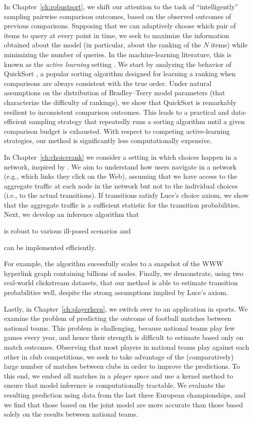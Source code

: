 In Chapter~\ref{ch:robustsort}, we shift our attention to the task of ``intelligently'' sampling pairwise comparison outcomes, based on the observed outcomes of previous comparisons.
Supposing that we can adaptively choose which pair of items to query at every point in time, we seek to maximize the information obtained about the model (in particular, about the ranking of the $N$ items) while minimizing the number of queries.
In the machine-learning literature, this is known as the \emph{active learning} setting \citep{settles2012active}.
We start by analyzing the behavior of QuickSort \citep{hoare1962quicksort}, a popular sorting algorithm designed for learning a ranking when comparisons are always consistent with the true order.
Under natural assumptions on the distribution of Bradley--Terry model parameters (that characterize the difficulty of rankings), we show that QuickSort is remarkably resilient to inconsistent comparison outcomes.
This leads to a practical and data-efficient sampling strategy that repeatedly runs a sorting algorithm until a given comparison budget is exhausted.
With respect to competing active-learning strategies, our method is significantly less computationally expensive.

In Chapter~\ref{ch:choicerank} we consider a setting in which choices happen in a network, inspired by \citet{kumar2015inverting}.
We aim to understand how users navigate in a network (e.g., which links they click on the Web), assuming that we have access to the aggregate traffic at each node in the network but not to the individual choices (i.e., to the actual transitions).
If transitions satisfy Luce's choice axiom, we show that the aggregate traffic is a sufficient statistic for the transition probabilities.
Next, we develop an inference algorithm that
\begin{enuminline}
\item is robust to various ill-posed scenarios and
\item can be implemented efficiently.
\end{enuminline}
For example, the algorithm sucessfully scales to a snapshot of the WWW hyperlink graph containing billions of nodes.
Finally, we demonstrate, using two real-world clickstream datasets, that our method is able to estimate transition probabilities well, despite the strong assumptions implied by Luce's axiom.

Lastly, in Chapter~\ref{ch:playerkern}, we switch over to an application in sports.
We examine the problem of predicting the outcome of football matches between national teams.
This problem is challenging, because national teams play few games every year, and hence their strength is difficult to estimate based only on match outcomes.
Observing that most players in national teams play against each other in club competitions, we seek to take advantage of the (comparatively) large number of matches between clubs in order to improve the predictions.
To this end, we embed all matches in a \emph{player space} and use a kernel method to ensure that model inference is computationally tractable.
We evaluate the resulting prediction using data from the last three European championships, and we find that those based on the joint model are more accurate than those based solely on the results between national teams.
